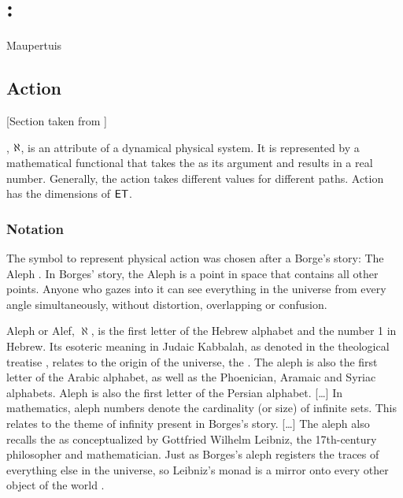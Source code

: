 \chapter{\docTitle: \docSubtitle}
%
%
%
{Maupertuis}
{\citep{leastaction:wiki}}


\section{Action}
%
[Section taken from \citep{action:wiki}]

, $\aleph$, is an attribute of a dynamical physical system. It is represented by a mathematical functional that takes the 
%
%
as its argument and results in a real number. Generally, the action takes different values for different paths. Action has the dimensions of $\mathsf{E}\mathsf{T}$.


\subsection{Notation}
%
The symbol to represent physical action was chosen after a Borge's story: The Aleph \citep{borges:wiki}. In Borges' story, the Aleph is a point in space that contains all other points. Anyone who gazes into it can see everything in the universe from every angle simultaneously, without distortion, overlapping or confusion.

Aleph or Alef, $\aleph$, is the first letter of the Hebrew alphabet and the number 1 in Hebrew. Its esoteric meaning in Judaic Kabbalah, as denoted in the theological treatise , relates to the origin of the universe, the . The aleph is also the first letter of the Arabic alphabet, as well as the Phoenician, Aramaic and Syriac alphabets. Aleph is also the first letter of the Persian alphabet. [\dots] In mathematics, aleph numbers denote the cardinality (or size) of infinite sets. This relates to the theme of infinity present in Borges's story. [\dots] The aleph also recalls the  as conceptualized by Gottfried Wilhelm Leibniz, the 17th-century philosopher and mathematician. Just as Borges's aleph registers the traces of everything else in the universe, so Leibniz's monad is a mirror onto every other object of the world \citep{borges:wiki}.


